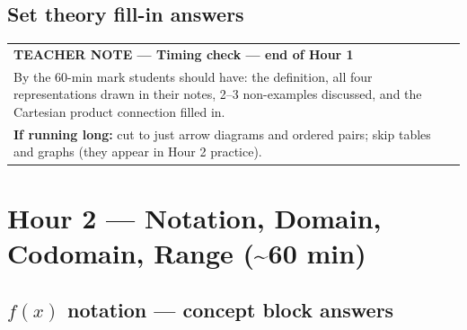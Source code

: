 \documentclass[11pt]{article}
\begin{document}
\subsection*{Set theory fill-in answers}

\medskip\noindent{}

\medskip
\begin{tabular}{|p{\dimexpr\linewidth-2\tabcolsep-2\arrayrulewidth\relax}|}
\hline
{\small\bfseries\sffamily TEACHER NOTE --- Timing check --- end of Hour 1}\\[3pt]
\small By the 60-min mark students should have: the definition, all four
representations drawn in their notes, 2--3 non-examples discussed,
and the Cartesian product connection filled in.\\[3pt]
\textbf{If running long:} cut to just arrow diagrams and ordered pairs;
skip tables and graphs (they appear in Hour 2 practice).\\[2pt]
\hline
\end{tabular}

\bigskip\bigskip


\newpage

\section*{Hour 2 --- Notation, Domain, Codomain, Range (\textasciitilde 60 min)}

\subsection*{$f(x)$ notation --- concept block answers}

\medskip\noindent{}
\end{document}
